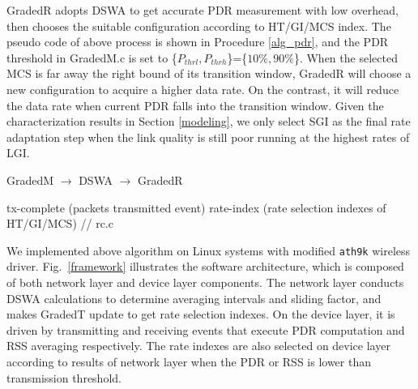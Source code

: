 \documentclass[journal,onecolumn,12pt]{IEEEtran}
\begin{document}
GradedR adopts DSWA to get accurate PDR measurement with low overhead, then chooses the suitable configuration according to HT/GI/MCS index. The pseudo code of above process is shown in Procedure \ref{alg_pdr}, and the PDR threshold in GradedM.c is set to \{$P_{thrl},P_{thrh}$\}=\{$10\%,90\%$\}. When the selected MCS is far away the right bound of its transition window, GradedR will choose a new configuration to acquire a higher data rate. On the contrast, it will reduce the data rate when current PDR falls into the transition window. Given the characterization results in Section \ref{modeling}, we only select SGI as the final rate adaptation step when the link quality is still poor running at the highest rates of LGI.
\begin{algorithm}[!t]
\renewcommand{\algorithmicrequire}{\textbf{Input:}}
\renewcommand{\algorithmicensure}{\textbf{Output:}}
\caption{GradedM $\rightarrow$ DSWA $\rightarrow$ GradedR}
\label{alg_pdr}
\begin{algorithmic}[1]
\Require tx-complete (packets transmitted event)
\Ensure  rate-index (rate selection indexes of HT/GI/MCS)
 // rc.c
\EndIf
{}
\EndIf
\State {}
\end{algorithmic}
\end{algorithm}

We implemented above algorithm on Linux systems with modified \texttt{ath9k} wireless driver. Fig.~\ref{framework} illustrates the software architecture, which is composed of both network layer and device layer components. The network layer conducts DSWA calculations to determine averaging intervals and sliding factor, and makes GradedT update to get rate selection indexes. On the device layer, it is driven by transmitting and receiving events that execute PDR computation and RSS averaging respectively. The rate indexes are also selected on device layer according to results of network layer when the PDR or RSS is lower than transmission threshold.



\renewcommand\refname{References}
%


\end{document}
